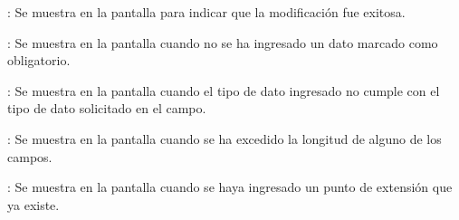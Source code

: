 \begin{Citemize}
	\item {}: Se muestra en la pantalla  para indicar que la modificación fue exitosa.
	\item {}: Se muestra en la pantalla  cuando no se ha ingresado un dato marcado como obligatorio.
	\item {}: Se muestra en la pantalla  cuando el tipo de dato ingresado no cumple con el tipo de dato solicitado en el campo.
	\item {}: Se muestra en la pantalla  cuando se ha excedido la longitud de alguno de los campos.
	\item {}: Se muestra en la pantalla  cuando se haya ingresado un punto de extensión que ya existe.
\end{Citemize}
